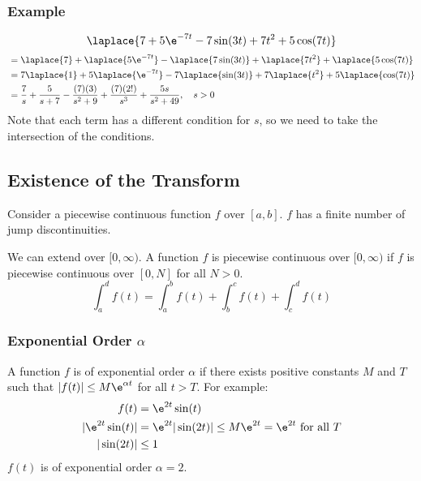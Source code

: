 \documentclass{math}
\begin{document}
\subsubsection*{Example}
\[ \laplace{7+5\e^{-7t}-7\sin(3t)+7t^2+5\cos(7t)} \]
\begin{align*}
  &= \laplace{7}+\laplace{5\e^{-7t}}-\laplace{7\sin(3t)}+\laplace{7t^2}+
    \laplace{5\cos(7t)} \\
  &= 7\laplace{1}+5\laplace{\e^{-7t}}-7\laplace{\sin(3t)}+7\laplace{t^2}+
    5\laplace{\cos(7t)} \\
  &= \frac{7}{s}+\frac{5}{s+7}-\frac{(7)(3)}{s^2+9}+\frac{(7)(2!)}{s^3}+
    \frac{5s}{s^2+49}, \quad s>0
\end{align*}
Note that each term has a different condition for \( s \), so we need to take
the intersection of the conditions.

\subsection*{Existence of the Transform}
Consider a piecewise continuous function \( f \) over \( [a,b] \). \( f \) has
a finite number of jump discontinuities.
\begin{center}
\end{center}
We can extend over \( [0,\infty) \). A function \( f \) is piecewise continuous
over \( [0,\infty) \) if \( f \) is piecewise continuous over \( [0,N] \) for
all \( N > 0 \).
\[ \int_{a}^{d}f(t) = \int_{a}^{b}f(t)+\int_{b}^{c}f(t)+\int_{c}^{d}f(t) \]

\subsubsection*{Exponential Order \( \alpha \)}
A function \( f \) is of exponential order \( \alpha \) if there exists
positive constants \( M \) and \( T \) such that \( |f(t)|\le M\e^{\alpha t} \)
for all \( t > T \). For example:
\begin{align*}
  f(t) &= \e^{2t}\sin(t) \\
  |\e^{2t}\sin(t)| &= \e^{2t}|\sin(2t)| \le
    M\e^{2t} = \e^{2t} \text{ for all } T \\
  |\sin(2t)| &\le 1
\end{align*}
\( f(t) \) is of exponential order \( \alpha = 2 \).
\end{document}
